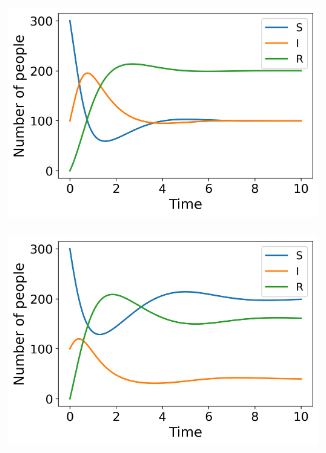 \documentclass[../main.tex]{subfiles}
\begin{document}
\iffalse
\begin{figure}[htb!]
    \centering
    \begin{subfigure}[b]{0.475\textwidth}
    \centering
    \includegraphics[width=0.9\textwidth]{../figures/SIRS_rk4_b=1.png}
    \caption{}
    \label{fig:b=1}
    \end{subfigure}
    \quad
    \begin{subfigure}[b]{0.475\textwidth}
    \includegraphics[width=0.9\textwidth]{../figures/SIRS_rk4_b=2.png}
    \caption{}
    \label{fig:b=2}
    \end{subfigure}
    

\end{figure}
\end{document}
